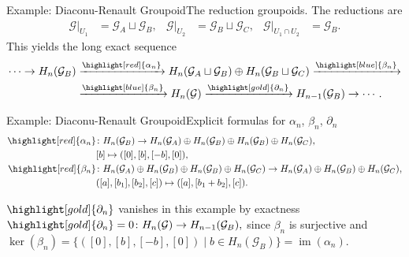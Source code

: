 \documentclass[aspectratio=169]{beamer}
\newcommand{\G}{\mathcal{G}}
\begin{document}
\begin{frame}{Example: Diaconu-Renault Groupoid}{The reduction groupoids.}
The reductions are
\[
\begin{aligned}
\mathcal G|_{U_1} &= \mathcal G_A\sqcup \mathcal G_B,&
\mathcal G|_{U_2} &= \mathcal G_B\sqcup \mathcal G_C,&
\mathcal G|_{U_1\cap U_2} &= \mathcal G_B.
\end{aligned}
\]
This yields the long exact sequence
\[
\begin{aligned}
\cdots\to
H_n(\mathcal G_B)
&\xrightarrow{\highlight[red]{\alpha_n}}
H_n(\mathcal G_A\sqcup\mathcal G_B)\oplus H_n(\mathcal G_B\sqcup\mathcal G_C)
\xrightarrow{\highlight[blue]{\beta_n}} \\
&\xrightarrow{\highlight[blue]{\beta_n}}
H_n(\mathcal G)
\xrightarrow{\highlight[gold]{\partial_n}}
H_{n-1}(\mathcal G_B)
\to\cdots.
\end{aligned}
\]
\end{frame}


\begin{frame}{Example: Diaconu-Renault Groupoid}{Explicit formulas for \(\alpha_n\), \(\beta_n\), \(\partial_n\)}
\[
\begin{aligned}
\highlight[red]{\alpha_n}&\colon H_n(\G_B)\to
H_n(\G_A)\oplus H_n(\G_B)\oplus H_n(\G_B)\oplus H_n(\G_C),\\
&[b] \mapsto ([0],[b],[-b],[0]),\\
\highlight[red]{\beta_n}&\colon
H_n(\G_A)\oplus H_n(\G_B)\oplus H_n(\G_B)\oplus H_n(\G_C)
\to H_n(\G_A)\oplus H_n(\G_B)\oplus H_n(\G_C),\\
&([a],[b_1],[b_2],[c]) \mapsto ([a],[b_1+b_2],[c]).
\end{aligned}
\]

\vspace{0.25cm}

\(\highlight[gold]{\partial_n}\) vanishes in this example by exactness
\(
\highlight[gold]{\partial_n}=0\colon H_n(\G)\to H_{n-1}(\G_B),
\)
since \(\beta_n\) is surjective and
\(
\ker(\beta_n)=\{([0],[b],[-b],[0])\mid b\in H_n(\G_B)\}=\operatorname{im}(\alpha_n)
\).
\end{frame}
\end{document}
